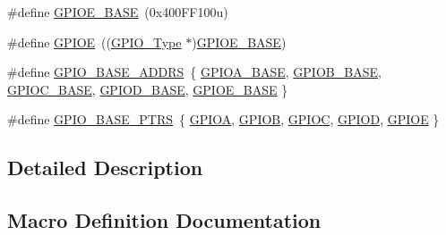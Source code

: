 \begin{DoxyCompactItemize}
\#define \mbox{\hyperlink{group___g_p_i_o___peripheral___access___layer_gab487b1983d936c4fee3e9e88b95aad9d}{G\+P\+I\+O\+E\+\_\+\+B\+A\+SE}}~(0x400\+F\+F100u)
\item 
\#define \mbox{\hyperlink{group___g_p_i_o___peripheral___access___layer_gae04bdb5e8acc47cab1d0532e6b0d0763}{G\+P\+I\+OE}}~((\mbox{\hyperlink{struct_g_p_i_o___type}{G\+P\+I\+O\+\_\+\+Type}} $\ast$)\mbox{\hyperlink{group___g_p_i_o___peripheral___access___layer_gab487b1983d936c4fee3e9e88b95aad9d}{G\+P\+I\+O\+E\+\_\+\+B\+A\+SE}})
\item 
\#define \mbox{\hyperlink{group___g_p_i_o___peripheral___access___layer_ga7f97513de5235b3600dc07bf327fe315}{G\+P\+I\+O\+\_\+\+B\+A\+S\+E\+\_\+\+A\+D\+D\+RS}}~\{ \mbox{\hyperlink{group___g_p_i_o___peripheral___access___layer_gad7723846cc5db8e43a44d78cf21f6efa}{G\+P\+I\+O\+A\+\_\+\+B\+A\+SE}}, \mbox{\hyperlink{group___g_p_i_o___peripheral___access___layer_gac944a89eb789000ece920c0f89cb6a68}{G\+P\+I\+O\+B\+\_\+\+B\+A\+SE}}, \mbox{\hyperlink{group___g_p_i_o___peripheral___access___layer_ga26f267dc35338eef219544c51f1e6b3f}{G\+P\+I\+O\+C\+\_\+\+B\+A\+SE}}, \mbox{\hyperlink{group___g_p_i_o___peripheral___access___layer_ga1a93ab27129f04064089616910c296ec}{G\+P\+I\+O\+D\+\_\+\+B\+A\+SE}}, \mbox{\hyperlink{group___g_p_i_o___peripheral___access___layer_gab487b1983d936c4fee3e9e88b95aad9d}{G\+P\+I\+O\+E\+\_\+\+B\+A\+SE}} \}
\item 
\#define \mbox{\hyperlink{group___g_p_i_o___peripheral___access___layer_gad0f7206167a584b1e75a81a5c30fa1c2}{G\+P\+I\+O\+\_\+\+B\+A\+S\+E\+\_\+\+P\+T\+RS}}~\{ \mbox{\hyperlink{group___g_p_i_o___peripheral___access___layer_gac485358099728ddae050db37924dd6b7}{G\+P\+I\+OA}}, \mbox{\hyperlink{group___g_p_i_o___peripheral___access___layer_ga68b66ac73be4c836db878a42e1fea3cd}{G\+P\+I\+OB}}, \mbox{\hyperlink{group___g_p_i_o___peripheral___access___layer_ga2dca03332d620196ba943bc2346eaa08}{G\+P\+I\+OC}}, \mbox{\hyperlink{group___g_p_i_o___peripheral___access___layer_ga7580b1a929ea9df59725ba9c18eba6ac}{G\+P\+I\+OD}}, \mbox{\hyperlink{group___g_p_i_o___peripheral___access___layer_gae04bdb5e8acc47cab1d0532e6b0d0763}{G\+P\+I\+OE}} \}
\end{DoxyCompactItemize}


\subsection{Detailed Description}


\subsection{Macro Definition Documentation}
\mbox{\label{group___g_p_i_o___peripheral___access___layer_ga7f97513de5235b3600dc07bf327fe315}} 

